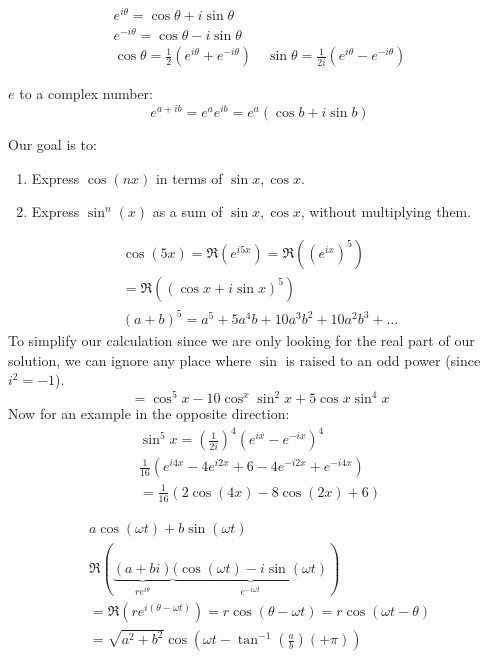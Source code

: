 \documentclass[00_complete]{subfiles}
\begin{document}
\begin{definition}
\[
\begin{gathered}
    e^{i \theta} = \cos \theta + i \sin \theta \\
    e^{-i \theta} = \cos  \theta - i \sin \theta \\
    \cos \theta = \frac{1}{2}\left(e^{i \theta}+e^{-i \theta}\right)
    \quad \sin \theta = \frac{1}{2i}\left(e^{i \theta} - e^{-i \theta}\right)
\end{gathered}
\]

\(e\) to a complex number:
\[
e^{a+ib} = e^a e^{ib} = e^a(\cos b + i\sin b)
\]

\end{definition}
Our goal is to:

\begin{enumerate}
\item
  Express \(\cos(nx)\) in terms of \(\sin x, \cos x\).
\item
  Express \(\sin^n(x)\) as a sum of \(\sin x, \cos x\), without
  multiplying them.
\end{enumerate}

\begin{example}
\[
\begin{gathered}
    \cos(5x) = \Re(e^{i5x}) = \Re((e^{ix})^5) \\
    = \Re((\cos x+i\sin x)^5) \\
    (a+b)^5 = a^5 + 5a^4b+10a^3b^2 + 10a^2b^3 + \ldots
\end{gathered}
\]
To simplify our calculation since we are only looking for the real part
of our solution, we can ignore any place where \(\sin\) is raised to an
odd power (since \(i^2 = -1\)). \[
    = \cos^5x-10\cos^x\sin^2x+5\cos x\sin^4x
\] Now for an example in the opposite direction: \[
\begin{gathered}
    \sin^5x = \left(\frac{1}{2i}\right)^4(e^{ix}-e^{-ix})^4 \\
    \frac{1}{16}(e^{i4x}-4e^{i2x} +6 -4 e^{-i2x}+e^{-i4x}) \\
    =\frac{1}{16}(2\cos (4x)-8 \cos (2x)+6)
\end{gathered}
\]
\end{example}
\begin{example}
\[
\begin{gathered}
    a \cos (\omega t) + b\sin(\omega t) \\
    \Re(\underbrace{(a+bi)}_{re^{i \theta}}\underbrace{(\cos(\omega t)- i \sin (\omega t)}_{e^{-i\omega t}}) \\
    = \Re\left(re^{i(\theta - \omega t)}\right)
    = r \cos(\theta - \omega t) = r \cos(\omega t - \theta)\\
    =\sqrt{a^2 + b^2} \cos\left(\omega t -\tan^{-1}\left(\frac{a}{b}\right)(+ \pi)\right)
\end{gathered}
\]
\end{example}
\end{document}
